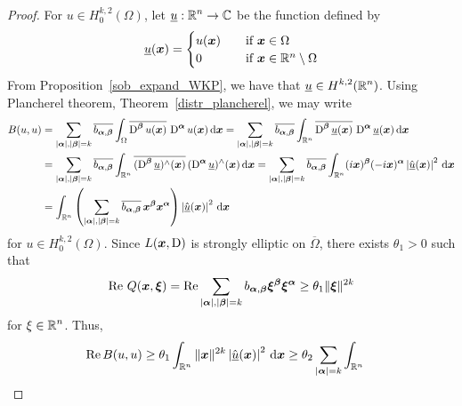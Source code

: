 \begin{proof}
For $\displaystyle u \in H^{k,2}_0(\Omega)$, let
$\displaystyle \underline{u}: \mathbb{R}^n \rightarrow \mathbb{C}$ be the function defined by
\[
\underline{u}({\bm{x}}) =
\begin{cases}
u({\bm{x}}) & \quad \text{if} \ {\bm{x}} \in \Omega \\
0 & \quad \text{if} \ {\bm{x}} \in \mathbb{R}^n \setminus \Omega
\end{cases}
\]
From Proposition~\ref{sob_expand_WKP}, we have that
$\displaystyle \underline{u}\in H^{k,2}(\mathbb{R}^n)$.
Using Plancherel theorem, Theorem~\ref{distr_plancherel}, we may write
\begin{align*}
B(u,u) &= \sum_{|{\bm{\alpha}}|,|{\bm{\beta}}|= k}
\overline{b_{{\bm{\alpha}},{\bm{\beta}}}} \int_{\Omega}
\overline{\operatorname{D}^{{\bm{\beta}}} u({\bm{x}})}\, \operatorname{D}^{{\bm{\alpha}}} u({\bm{x}})
\,\mathrm{d}{{\bm{x}}}
= \sum_{|{\bm{\alpha}}|,|{\bm{\beta}}|= k} \overline{b_{{\bm{\alpha}},{\bm{\beta}}}}
\int_{\mathbb{R}^n} \overline{\operatorname{D}^{{\bm{\beta}}} \underline{u}({\bm{x}})}\,
\operatorname{D}^{{\bm{\alpha}}} \underline{u}({\bm{x}}) \,\mathrm{d}{{\bm{x}}} \\
&= \sum_{|{\bm{\alpha}}|,|{\bm{\beta}}|= k} \overline{b_{{\bm{\alpha}},{\bm{\beta}}}}
\int_{\mathbb{R}^n} \overline{(\operatorname{D}^{{\bm{\beta}}} \underline{u})^\wedge({\bm{x}})}\,
(\operatorname{D}^{{\bm{\alpha}}} \underline{u})^\wedge({\bm{x}}) \,\mathrm{d}{{\bm{x}}}
= \sum_{|{\bm{\alpha}}|,|{\bm{\beta}}|= k} \overline{b_{{\bm{\alpha}},{\bm{\beta}}}}
\int_{\mathbb{R}^n} (i{\bm{x}})^{{\bm{\beta}}} (-i{\bm{x}})^{{\bm{\alpha}}}
\left| \hat{\underline{u}}({\bm{x}}) \right|^2 \,\mathrm{d}{{\bm{x}}} \\
&= \int_{\mathbb{R}^n} \left( \sum_{|{\bm{\alpha}}|,|{\bm{\beta}}|= k}
\overline{b_{{\bm{\alpha}},{\bm{\beta}}}} \,{\bm{x}}^{{\bm{\beta}}}
{\bm{x}}^{{\bm{\alpha}}} \right)
\left| \hat{\underline{u}}({\bm{x}}) \right|^2 \,\mathrm{d}{{\bm{x}}}
\end{align*}
for $\displaystyle u \in H^{k,2}_0(\Omega)$.
Since $L({\bm{x}},\operatorname{D})$ is strongly elliptic on $\overline{\Omega}$,
there exists $\theta_1 >0$ such that
\begin{equation} \label{ell_garding2_theta}
\operatorname{Re}\, Q({\bm{x}}, {\bm{\xi}}) = \operatorname{Re}
\sum_{|{\bm{\alpha}}|,|{\bm{\beta}}|=k} b_{{\bm{\alpha}},{\bm{\beta}}}
{\bm{\xi}}^{{\bm{\beta}}} {\bm{\xi}}^{{\bm{\alpha}}} \geq \theta_1 \|{\bm{\xi}}\|^{2k}
\end{equation}
for $\displaystyle \xi \in \mathbb{R}^n$.  Thus,
\begin{align*}
\RE B(u,u) &\geq \theta_1 \int_{\RR^n} \| \VEC{x} \|^{2k}
\left| \hat{\underline{u}}(\VEC{x}) \right|^2 \dx{\VEC{x}}
\geq \theta_2 \sum_{|\VEC{\alpha}|=k} \int_{\RR^n}

\end{align*}
\end{proof}

